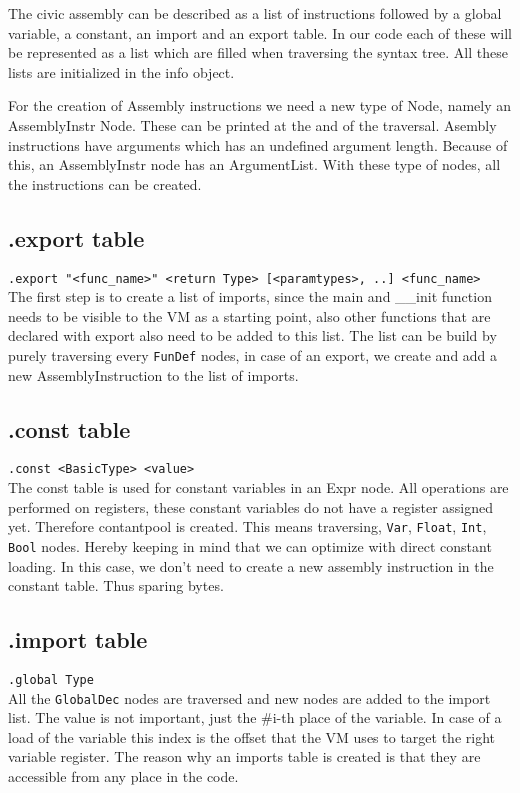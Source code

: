 \documentclass[a4paper]{article}
\begin{document}
The civic assembly can be described as a list of instructions followed by
a global variable, a constant, an import and an export table. In our code each
of these will be represented as a list which are filled when traversing the
syntax tree. All these lists are initialized in the info object.

For the creation of Assembly instructions we need a new type of Node, namely an
AssemblyInstr Node. These can be printed at the and of the traversal.
Asembly instructions have arguments which has an undefined argument length.
Because of this, an AssemblyInstr node has an ArgumentList. With these type of
nodes, all the instructions can be created.

\subsection{.export table}
\texttt{.export "<func\_name>" <return Type> [<paramtypes>, ..] <func\_name>} \\
The first step is to create a list of imports, since the main and \_\_init function
needs to be visible to the VM as a starting point, also other functions that are
declared with export also need to be added to this list. The list can be build
by purely traversing every \texttt{FunDef} nodes, in case of an export, we
create and add a new AssemblyInstruction to the list of imports.

\subsection{.const table}
\texttt{.const <BasicType> <value>} \\
The const table is used for constant variables in an Expr node. All operations
are performed on registers, these constant variables do not have a register
assigned yet. Therefore contantpool is created. This means traversing,
\texttt{Var}, \texttt{Float}, \texttt{Int}, \texttt{Bool} nodes. Hereby keeping
in mind that we can optimize with direct constant loading. In this case, we
don't need to create a new assembly instruction in the constant table. Thus
sparing bytes.

\subsection{.import table}
\texttt{.global Type}\\
All the \texttt{GlobalDec} nodes are traversed and new nodes are added to the import
list. The value is not important, just the \#i-th place of the variable. In case
of a load of the variable this index is the offset that the VM uses to target
the right variable register. The reason why an imports table is created is that
they are accessible from any place in the code.
\end{document}
